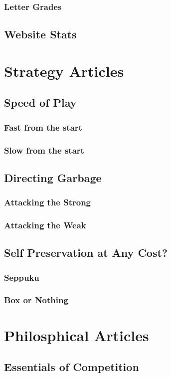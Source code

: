 \documentclass[a4paper,twoside,titlepage]{book}
\begin{document}
      \section{Letter Grades}
    \chapter{Website Stats}
  \part{Strategy Articles}
    \chapter{Speed of Play}
      \section{Fast from the start}
      \section{Slow from the start}
    \chapter{Directing Garbage}
      \section{Attacking the Strong}
      \section{Attacking the Weak}
    \chapter{Self Preservation at Any Cost?}
      \section{Seppuku}
      \section{Box or Nothing}
  \part{Philosphical Articles}
    \chapter{Essentials of Competition}
\end{document}
